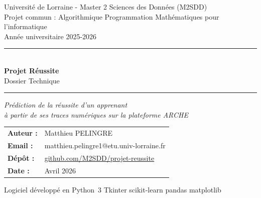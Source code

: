 \documentclass[12pt, a4paper, french]{report}
\begin{document}
\begin{titlepage}
  \centering
  \vspace*{1.5cm}

  {\large\color{pythonblue} Université de Lorraine - Master 2 Sciences des Données (M2SDD)}\\[0.4cm]
  {\normalsize Projet commun : Algorithmique \textperiodcentered{}
    Programmation \textperiodcentered{}
    Mathématiques pour l'informatique}\\[0.3cm]
  {\normalsize Année universitaire 2025-2026}

  \vspace{1.5cm}
  \noindent\rule{\textwidth}{2pt}\\[0.3cm]
  {\Huge\bfseries\color{pythondark} Projet Réussite}\\[0.5cm]
  {\LARGE\color{pythonblue} Dossier Technique}\\[0.3cm]
  \noindent\rule{\textwidth}{2pt}

  \vspace{1.5cm}

  \begin{tcolorbox}[colback=pythonlight, colframe=pythonblue, arc=6pt, boxrule=1.5pt]
    \centering
    \textit{Prédiction de la réussite d'un apprenant\\
    à partir de ses traces numériques sur la plateforme ARCHE}
  \end{tcolorbox}

  \vspace{2cm}

  \begin{tabular}{ll}
    \textbf{Auteur :}  & Matthieu PELINGRE \\
    \textbf{Email :}   & matthieu.pelingre1@etu.univ-lorraine.fr \\
    \textbf{Dépôt :} & \href{https://github.com/M2SDD/projet-reussite}{github.com/M2SDD/projet-reussite} \\
    \textbf{Date :}    & Avril 2026 \\
  \end{tabular}

  \vfill

  {\small\color{gray}
    Logiciel développé en Python~3 \textperiodcentered{}
    Tkinter \textperiodcentered{} scikit-learn \textperiodcentered{}
    pandas \textperiodcentered{} matplotlib
  }
\end{titlepage}
\end{document}
